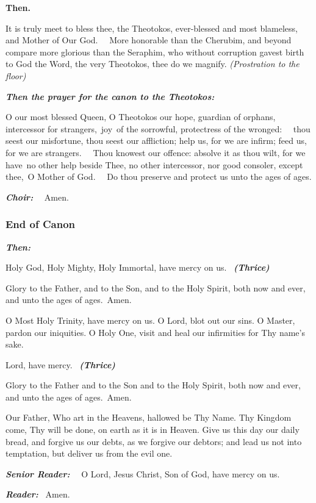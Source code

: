 \textbf{Then.}

It is truly meet to bless thee, the Theotokos, ever-blessed and most blameless, and Mother of Our God.
~~More honorable than the Cherubim, and beyond compare more glorious than the Seraphim, who without corruption gavest birth to God the Word, the very Theotokos, thee do we magnify.
\emph{(Prostration to the floor)}

\textbf{\emph{Then the prayer for the canon to the Theotokos:}}

O our most blessed Queen, O Theotokos our hope, guardian of orphans, intercessor for strangers,~joy~of the sorrowful, protectress of the wronged:
~~thou seest our misfortune, thou seest our affliction; 
help us, for we are infirm; 
feed us, for we are strangers.
~~Thou knowest our offence: 
absolve it as thou wilt, for we have~no other help beside Thee, no other intercessor, nor good consoler, except thee,~O Mother of God.
~~Do thou preserve and protect us unto the ages of ages.

\textbf{\emph{Choir:}}
~~Amen.

\subsubsection{End of Canon}\label{end-of-canon}

\textbf{\emph{Then:}}

Holy God, Holy Mighty, Holy Immortal, have mercy on us.
~\textbf{\emph{(Thrice)}}

Glory to the Father, and to the Son, and to the Holy Spirit, both now and ever, and unto the ages of ages.~Amen.

O Most Holy Trinity, have mercy on us. 
O Lord, blot out our sins. 
O Master, pardon our iniquities. 
O Holy One, visit and heal our infirmities for Thy name's sake.

Lord, have mercy.
~\textbf{\emph{(Thrice)}}

Glory to the Father and to the Son and to the Holy Spirit, both now and ever, and unto the ages of ages.~Amen.

Our Father, Who art in the Heavens, hallowed be Thy Name. 
Thy Kingdom come, Thy will be done, on earth as it is in Heaven. 
Give us this day our daily bread, and forgive us our debts, as we forgive our debtors;
and lead us not into temptation, but deliver us from the evil one.

\textbf{\emph{Senior Reader:}}
~~O Lord, Jesus Christ, Son of God, have mercy on us.

\textbf{\emph{Reader:}}
~Amen.

